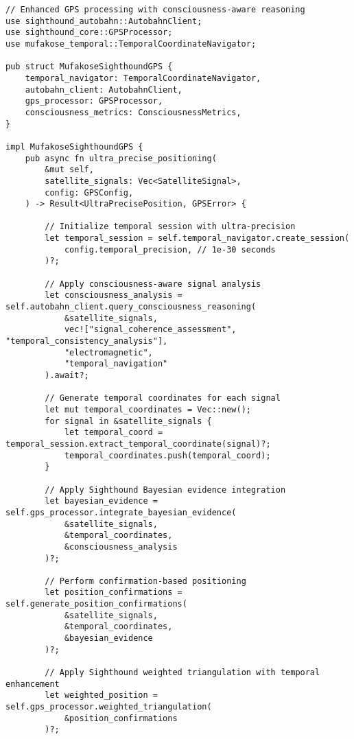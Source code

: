 \documentclass[12pt,a4paper]{article}
\begin{document}
\begin{lstlisting}[style=ruststyle, caption=Rust Integration with Sighthound Autobahn Framework]
// Enhanced GPS processing with consciousness-aware reasoning
use sighthound_autobahn::AutobahnClient;
use sighthound_core::GPSProcessor;
use mufakose_temporal::TemporalCoordinateNavigator;

pub struct MufakoseSighthoundGPS {
    temporal_navigator: TemporalCoordinateNavigator,
    autobahn_client: AutobahnClient,
    gps_processor: GPSProcessor,
    consciousness_metrics: ConsciousnessMetrics,
}

impl MufakoseSighthoundGPS {
    pub async fn ultra_precise_positioning(
        &mut self,
        satellite_signals: Vec<SatelliteSignal>,
        config: GPSConfig,
    ) -> Result<UltraPrecisePosition, GPSError> {
        
        // Initialize temporal session with ultra-precision
        let temporal_session = self.temporal_navigator.create_session(
            config.temporal_precision, // 1e-30 seconds
        )?;
        
        // Apply consciousness-aware signal analysis
        let consciousness_analysis = self.autobahn_client.query_consciousness_reasoning(
            &satellite_signals,
            vec!["signal_coherence_assessment", "temporal_consistency_analysis"],
            "electromagnetic",
            "temporal_navigation"
        ).await?;
        
        // Generate temporal coordinates for each signal
        let mut temporal_coordinates = Vec::new();
        for signal in &satellite_signals {
            let temporal_coord = temporal_session.extract_temporal_coordinate(signal)?;
            temporal_coordinates.push(temporal_coord);
        }
        
        // Apply Sighthound Bayesian evidence integration
        let bayesian_evidence = self.gps_processor.integrate_bayesian_evidence(
            &satellite_signals,
            &temporal_coordinates,
            &consciousness_analysis
        )?;
        
        // Perform confirmation-based positioning
        let position_confirmations = self.generate_position_confirmations(
            &satellite_signals,
            &temporal_coordinates,
            &bayesian_evidence
        )?;
        
        // Apply Sighthound weighted triangulation with temporal enhancement
        let weighted_position = self.gps_processor.weighted_triangulation(
            &position_confirmations
        )?;
        

\end{lstlisting}
\end{document}
